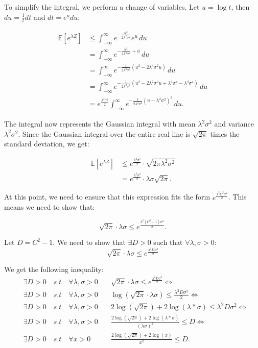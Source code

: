 \documentclass[a4 paper]{article}
\theoremstyle{boldStyle}
\theoremstyle{boldBlueStyle}
\theoremstyle{boldPurpleStyle}
\theoremstyle{boldRedStyle}
\begin{document}
To simplify the integral, we perform a change of variables. Let \(u = \log t\), then \(du = \frac{1}{t} dt\) and \(dt = e^u du\):

\begin{align*}
\mathbb{E}[e^{\lambda Z}] &\leq \int_{-\infty}^{\infty} e^{-\frac{u^2}{2\lambda^2 \sigma^2}} e^u \, du \\
&= \int_{-\infty}^{\infty} e^{-\frac{u^2}{2\lambda^2 \sigma^2} + u} \, du \\
&= \int_{-\infty}^{\infty} e^{-\frac{1}{2\lambda^2 \sigma^2}(u^2 - 2\lambda^2 \sigma^2 u)} \, du \\
&= \int_{-\infty}^{\infty} e^{-\frac{1}{2\lambda^2 \sigma^2}\left(u^2 - 2\lambda^2 \sigma^2 u + \lambda^4 \sigma^4 - \lambda^4 \sigma^4\right)} \, du \\
&= e^{\frac{\lambda^2 \sigma^2}{2}} \int_{-\infty}^{\infty} e^{-\frac{1}{2\lambda^2 \sigma^2}(u - \lambda^2 \sigma^2)^2} \, du.
\end{align*}

The integral now represents the Gaussian integral with mean \(\lambda^2 \sigma^2\) and variance \(\lambda^2 \sigma^2\). Since the Gaussian integral over the entire real line is \(\sqrt{2\pi}\) times the standard deviation, we get:

\begin{align*}
\mathbb{E}[e^{\lambda Z}] &\leq e^{\frac{\lambda^2 \sigma^2}{2}} \cdot \sqrt{2\pi \lambda^2 \sigma^2} \\
&= e^{\frac{\lambda^2 \sigma^2}{2}} \cdot \lambda \sigma \sqrt{2\pi}.
\end{align*}

At this point, we need to ensure that this expression fits the form \(e^{\frac{\lambda^2 C^2 \sigma^2}{2}}\). This means we need to show that:

\[
\sqrt{2\pi} \cdot \lambda \sigma \leq e^{\frac{\lambda^2 (C^2 - 1) \sigma^2}{2}}.
\]

Let $D = C^2 - 1$. We need to show that $\exists D > 0$ such that $\forall \lambda, \sigma > 0$:
\[
\sqrt{2\pi} \cdot \lambda \sigma \leq e^{\frac{\lambda^2 D \sigma^2}{2}}
\]

We get the following inequality:
\begin{align*}  
&\exists D > 0 \quad {s.t} \quad \forall \lambda , \sigma >0 \quad &\sqrt{2\pi} \cdot \lambda \sigma \leq e^{\frac{\lambda^2 D \sigma^2}{2}} \iff \\
&\exists D > 0 \quad {s.t} \quad \forall \lambda , \sigma >0 \quad &\log(\sqrt{2\pi} \cdot \lambda \sigma) \leq \frac{\lambda^2 D \sigma^2}{2} \iff \\
&\exists D > 0 \quad {s.t} \quad \forall \lambda , \sigma >0 \quad &2\log(\sqrt{2\pi}) + 2\log(\lambda * \sigma) \leq \lambda^2 D \sigma^2 \iff \\
&\exists D > 0 \quad {s.t} \quad \forall \lambda , \sigma >0 \quad &\frac{2\log(\sqrt{2\pi}) + 2\log(\lambda * \sigma)}{(\lambda \sigma)^2} \leq D \iff \\
&\exists D > 0 \quad {s.t} \quad \forall x >0  &\frac{2\log(\sqrt{2\pi}) + 2\log(x)}{x^2} \leq D.
\end{align*}
\end{document}

